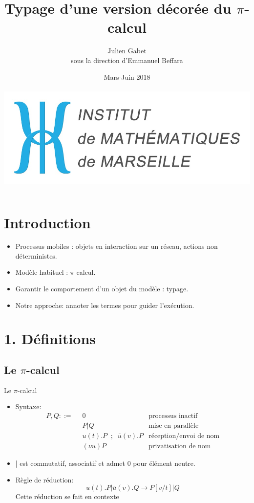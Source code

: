 \documentclass[11pt]{beamer}
\author{Julien Gabet\\
sous la direction d'Emmanuel Beffara}
\title{Typage d'une version décorée du $\pi$-calcul}
\institute{Institut de Mathématiques de Marseille}
\date{Mars-Juin 2018\\~\\
\includegraphics[scale=0.1]{institutMathMarseille.jpg}}
\begin{document}
\begin{frame}
\titlepage
\end{frame}


\begin{frame}
\tableofcontents
\end{frame}

\section{Introduction}

\begin{frame}
\begin{itemize}
\item Processus mobiles : objets en interaction sur un réseau, actions non déterministes.
\item Modèle habituel : $\pi$-calcul.
\item Garantir le comportement d'un objet du modèle : typage.
\item Notre approche: annoter les termes pour guider l'exécution.
\end{itemize}
\end{frame}

\section{1. Définitions}
\subsection{Le $\pi$-calcul}

\begin{frame}{Le $\pi$-calcul}
\begin{itemize}
\item Syntaxe:
\begin{align*}
P,Q::=\;\; & 0 & \text{processus inactif}\\
& P\bigl|Q & \text{mise en parallèle}\\
& u(t).P\;\;;\;\;\bar{u}(v).P & \text{réception/envoi de nom}\\
& (\nu u)P & \text{privatisation de nom}
\end{align*}
\pause\item | est commutatif, associatif et admet 0 pour élément neutre.
\pause\item Règle de réduction:
\[u(t).P\bigl|\bar{u}(v).Q\to P[v/t]|Q\]
Cette réduction se fait en contexte
\end{itemize}
\end{frame}
\end{document}

